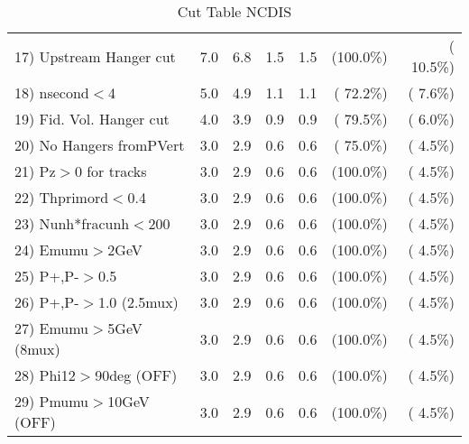 \begin{table}[h!]
\begin{tabular}{||l||r|r|r|r|r|r||}
 17) Upstream Hanger cut  &          7.0 &          6.8 &          1.5 &          1.5 & (100.0\%) & ( 10.5\%) \\
 18) nsecond$<$4          &          5.0 &          4.9 &          1.1 &          1.1 & ( 72.2\%) & (  7.6\%) \\
 19) Fid. Vol. Hanger cut &          4.0 &          3.9 &          0.9 &          0.9 & ( 79.5\%) & (  6.0\%) \\
 20) No Hangers fromPVert &          3.0 &          2.9 &          0.6 &          0.6 & ( 75.0\%) & (  4.5\%) \\
 21) Pz$>$0 for tracks    &          3.0 &          2.9 &          0.6 &          0.6 & (100.0\%) & (  4.5\%) \\
 22) Thprimord$<$0.4      &          3.0 &          2.9 &          0.6 &          0.6 & (100.0\%) & (  4.5\%) \\
 23) Nunh*fracunh$<$200   &          3.0 &          2.9 &          0.6 &          0.6 & (100.0\%) & (  4.5\%) \\
 24) Emumu$>$2GeV         &          3.0 &          2.9 &          0.6 &          0.6 & (100.0\%) & (  4.5\%) \\
 25) P+,P-$>$0.5          &          3.0 &          2.9 &          0.6 &          0.6 & (100.0\%) & (  4.5\%) \\
 26) P+,P-$>$1.0 (2.5mux) &          3.0 &          2.9 &          0.6 &          0.6 & (100.0\%) & (  4.5\%) \\
 27) Emumu$>$5GeV  (8mux) &          3.0 &          2.9 &          0.6 &          0.6 & (100.0\%) & (  4.5\%) \\
 28) Phi12$>$90deg  (OFF) &          3.0 &          2.9 &          0.6 &          0.6 & (100.0\%) & (  4.5\%) \\
 29) Pmumu$>$10GeV  (OFF) &          3.0 &          2.9 &          0.6 &          0.6 & (100.0\%) & (  4.5\%) \\
 \hline
 \hline
 \end{tabular}
 \caption{Cut Table  NCDIS    }
 \label{tab-cutcohjpsi-mumu_ncdis}
 \end{table}
